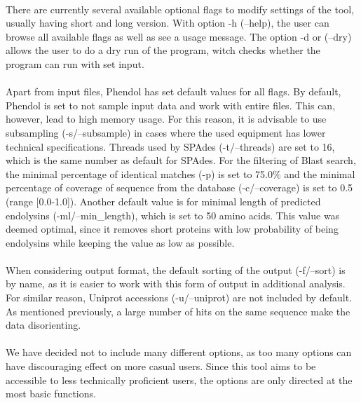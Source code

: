 \paragraph*{} 
There are currently several available optional flags to modify settings of the tool, usually having short and long version. With option -h (--help), the user can browse all available flags as well as see a usage message. The option -d or (--dry) allows the user to do a dry run of the program, witch checks whether the program can run with set input.
\paragraph*{}
Apart from input files, Phendol has set default values for all flags. By default, Phendol is set to not sample input data and work with entire files. This can, however, lead to high memory usage. For this reason, it is advisable to use subsampling (-s/--subsample) in cases where the used equipment has lower technical specifications. Threads used by SPAdes (-t/--threads) are set to 16, which is the same number as default for SPAdes. For the filtering of Blast search, the minimal percentage of identical matches (-p) is set to 75.0\% and the minimal percentage of coverage of sequence from the database (-c/--coverage) is set to 0.5 (range [0.0-1.0]). Another default value is for minimal length of predicted endolysins (-ml/--min\_length), which is set to 50 amino acids. This value was deemed optimal, since it removes short proteins with low probability of being endolysins while keeping the value as low as possible. 
\paragraph*{}
When considering output format, the default sorting of the output (-f/--sort) is by name, as it is easier to work with this form of output in additional analysis. For similar reason, Uniprot accessions (-u/--uniprot) are not included by default. As mentioned previously, a large number of hits on the same sequence make the data disorienting.
\paragraph*{}
We have decided not to include many different options, as too many options can have discouraging effect on more casual users. Since this tool aims to be accessible to less technically proficient users, the options are only directed at the most basic functions.

